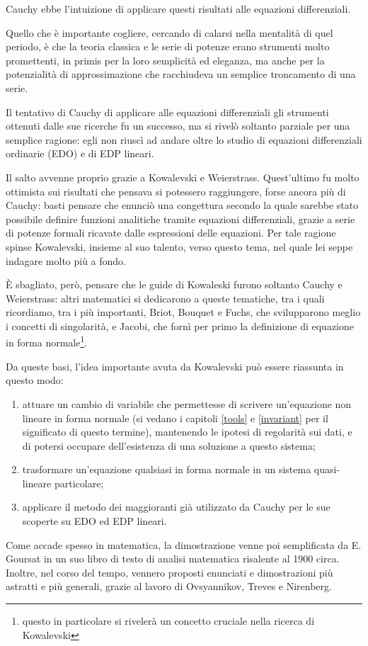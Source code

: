 Cauchy ebbe l'intuizione di applicare questi risultati alle equazioni differenziali. 

Quello che è importante cogliere, cercando di calarsi nella mentalità di quel periodo, è che la teoria classica e le serie di potenze erano strumenti molto promettenti, in primis per la loro semplicità ed eleganza, ma anche per la potenzialità di approssimazione che racchiudeva un semplice troncamento di una serie.

Il tentativo di Cauchy di applicare alle equazioni differenziali gli strumenti ottenuti dalle sue ricerche fu un successo, ma si rivelò soltanto parziale per una semplice ragione: egli non riuscì ad andare oltre lo studio di equazioni differenziali ordinarie (EDO) e di EDP lineari.

Il salto avvenne proprio grazie a Kowalevski e Weierstrass. Quest'ultimo fu molto ottimista sui risultati che pensava si potessero raggiungere, forse ancora più di Cauchy: basti pensare che enunciò una congettura secondo la quale sarebbe stato possibile definire funzioni analitiche tramite equazioni differenziali, grazie a serie di potenze formali ricavate dalle espressioni delle equazioni.
Per tale ragione spinse Kowalevski, insieme al suo talento, verso questo tema, nel quale lei seppe indagare molto più a fondo.

È sbagliato, però, pensare che le guide di Kowaleski furono soltanto Cauchy e Weierstrass: altri matematici si dedicarono a queste tematiche, tra i quali ricordiamo, tra i più importanti, Briot, Bouquet e Fuchs, che svilupparono meglio i concetti di singolarità, e Jacobi, che fornì per primo la definizione di equazione in forma normale\footnote{questo in particolare si rivelerà un concetto cruciale nella ricerca di Kowalevski}.

Da queste basi, l’idea importante avuta da Kowalevski può essere riassunta in questo modo: 
\begin{enumerate}
\item attuare un cambio di variabile che permettesse di scrivere un'equazione non lineare in forma normale (si vedano i capitoli \ref{tools} e \ref{invariant} per il significato di questo termine), mantenendo le ipotesi di regolarità sui dati, e di potersi occupare dell’esistenza di una soluzione a questo sistema;
\item trasformare un'equazione qualsiasi in forma normale in un sistema quasi-lineare particolare;
\item applicare il metodo dei maggioranti già utilizzato da Cauchy per le sue scoperte su EDO ed EDP lineari.
\end{enumerate}
Come accade spesso in matematica, la dimostrazione venne poi semplificata da E. Goursat in un suo libro di testo di analisi matematica risalente al 1900 circa. Inoltre, nel corso del tempo, vennero proposti enunciati e dimostrazioni più astratti e più generali, grazie al lavoro di Ovsyannikov, Treves e Nirenberg.

